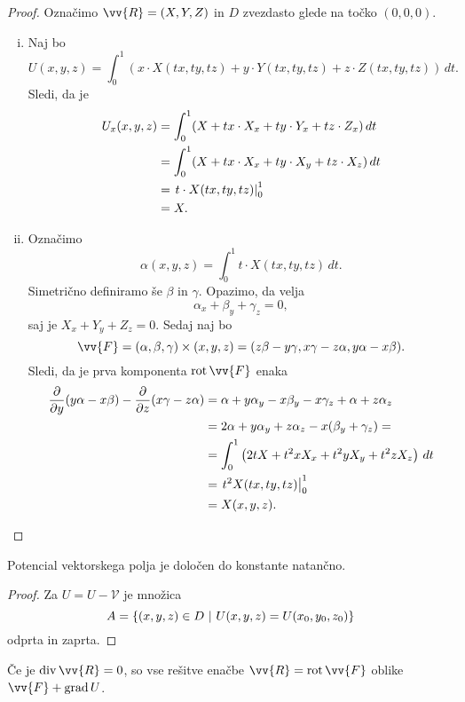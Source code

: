 \begin{proof}
Označimo $\vv{R} = (X, Y, Z)$ in $D$ zvezdasto glede na točko
$(0, 0, 0)$.

\begin{enumerate}[i)]
\item Naj bo
\[
U(x,y,z) = \int_0^1 \left(
x \cdot X(tx, ty, tz) +
y \cdot Y(tx, ty, tz) +
z \cdot Z(tx, ty, tz)
\right)\,dt.
\]
Sledi, da je
\begin{align*}
U_x(x,y,z)
&=
\int_0^1 (X + tx \cdot X_x + ty \cdot Y_x + tz \cdot Z_x )\,dt
\\
&=
\int_0^1 (X + tx \cdot X_x + ty \cdot X_y + tz \cdot X_z)\,dt
\\
&=
\left. t \cdot X(tx, ty, tz)\right|_{0}^{1}
\\
&= X.
\end{align*}
\item Označimo
\[
\alpha(x,y,z) = \int_0^1 t \cdot X(tx, ty, tz)\,dt.
\]
Simetrično definiramo še $\beta$ in $\gamma$. Opazimo, da velja
\[
\alpha_x + \beta_y + \gamma_z = 0,
\]
saj je $X_x + Y_y + Z_z = 0$. Sedaj naj bo
\[
\vv{F} =
(\alpha, \beta, \gamma) \times (x, y, z) =
(z \beta - y \gamma, x \gamma - z \alpha, y \alpha - x \beta).
\]
Sledi, da je prva komponenta $\rot \vv{F}$ enaka
\begin{align*}
\frac{\partial}{\partial y} (y \alpha - x \beta) -
\frac{\partial}{\partial z} (x \gamma - z \alpha)
&=
\alpha + y \alpha_y - x \beta_y - x \gamma_z + \alpha + z \alpha_z
\\
&=
2 \alpha + y \alpha_y + z \alpha_z - x(\beta_y + \gamma_z) =
\\
&=
\int_0^1 \left(2t X + t^2x X_x + t^2y X_y + t^2z X_z\right)\,dt
\\
&=
\left. t^2 X(tx, ty, tz)\right|_{0}^{1}
\\
&= X(x, y, z). \qedhere
\end{align*}
\end{enumerate}
\end{proof}

\begin{opomba}
Potencial vektorskega polja je določen do konstante natančno.
\end{opomba}

\begin{proof}
Za $U = U - \mathcal{V}$ je množica
\[
A = \left\{(x,y,z) \in D~\middle\vert~U(x,y,z) = U(x_0,y_0,z_0)\right\}
\]
odprta in zaprta.
\end{proof}

\begin{opomba}
Če je $\dv \vv{R} = 0$, so vse rešitve enačbe
$\vv{R} = \rot \vv{F}$ oblike $\vv{F} + \grad U$.
\end{opomba}

